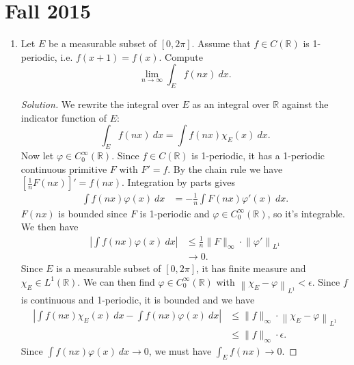 \documentclass[11pt,letterpaper]{report}
\newcommand{\reals}{\mathbb{R}}
\newcommand{\Lp}[2]{\left\|{#1}\right\|_{L^{#2}}}
\newenvironment{solution}
{\begin{proof}[Solution]}
{\end{proof}}
\begin{document}
\section*{Fall 2015}
\begin{enumerate}
	\item Let $E$ be a measurable subset of $[0, 2\pi]$. Assume that $f\in C(\reals)$ is 1-periodic, i.e. $f(x+1) = f(x)$. Compute
	\[
	\lim_{n\to \infty}\int_Ef(nx)\ dx.
	\]
	\begin{solution}
		We rewrite the integral over $E$ as an integral over $\reals$ against the indicator function of $E$:
		\[
		\int_Ef(nx)\ dx = \int f(nx)\chi_E(x)\ dx.
		\]
		Now let $\varphi\in C^\infty_0(\reals)$. Since $f\in C(\reals)$ is 1-periodic, it has a 1-periodic continuous primitive $F$ with $F' = f$. By the chain rule we have $[\frac{1}{n}F(nx)]' = f(nx)$. Integration by parts gives
		\begin{align*}
		\int f(nx)\varphi(x)\ dx&= -\frac{1}{n}\int F(nx)\varphi'(x)\ dx.
		\end{align*}
		$F(nx)$ is bounded since $F$ is 1-periodic and $\varphi\in C^\infty_0(\reals)$, so it's integrable. We then have
		\begin{align*}
			\left|\int f(nx)\varphi(x)\ dx\right|& \leq \frac{1}{n}\|F\|_\infty\cdot \Lp{\varphi'}{1}\\
			&\to 0.
		\end{align*}
		Since $E$ is a measurable subset of $[0,2\pi]$, it has finite measure and $\chi_E\in L^1(\reals)$. We can then find $\varphi\in C_0^\infty(\reals)$ with $\Lp{\chi_E-\varphi}{1}<\epsilon$. Since $f$ is continuous and 1-periodic, it is bounded and we have
		\begin{align*}
			\left|\int f(nx)\chi_E(x)\ dx - \int f(nx)\varphi(x)\ dx\right| &\leq \|f\|_\infty\cdot \Lp{\chi_E-\varphi}{1}\\
			&\leq \|f\|_\infty\cdot \epsilon.
		\end{align*}
		Since $\int f(nx)\varphi(x)\ dx\to 0$, we must have $\int_Ef(nx)\to 0$.
	\end{solution}


\end{enumerate}
\end{document}
